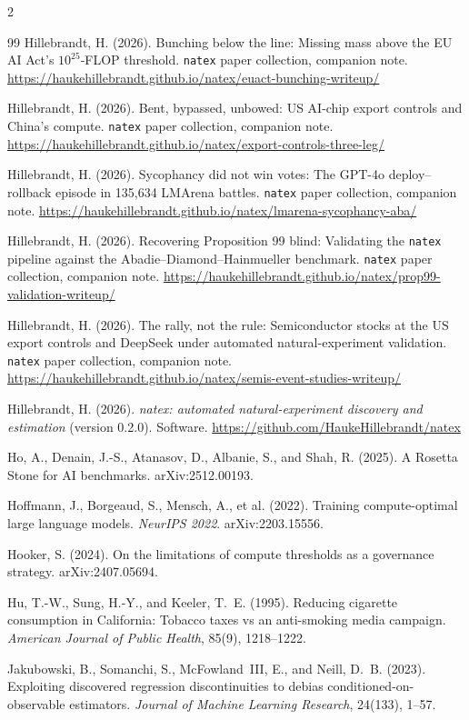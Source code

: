 \documentclass[11pt]{article}
\newcommand{\natex}{\texttt{natex}}
\begin{document}
\begin{multicols}{2}
\begin{thebibliography}{99}
Hillebrandt, H. (2026).
Bunching below the line: Missing mass above the EU AI Act's
$10^{25}$-FLOP threshold.
\natex{} paper collection, companion note.
\url{https://haukehillebrandt.github.io/natex/euact-bunching-writeup/}

Hillebrandt, H. (2026).
Bent, bypassed, unbowed: US AI-chip export controls and China's compute.
\natex{} paper collection, companion note.
\url{https://haukehillebrandt.github.io/natex/export-controls-three-leg/}

Hillebrandt, H. (2026).
Sycophancy did not win votes: The GPT-4o deploy--rollback episode in
135,634 LMArena battles.
\natex{} paper collection, companion note.
\url{https://haukehillebrandt.github.io/natex/lmarena-sycophancy-aba/}

Hillebrandt, H. (2026).
Recovering Proposition 99 blind: Validating the \natex{} pipeline against
the Abadie--Diamond--Hainmueller benchmark.
\natex{} paper collection, companion note.
\url{https://haukehillebrandt.github.io/natex/prop99-validation-writeup/}

Hillebrandt, H. (2026).
The rally, not the rule: Semiconductor stocks at the US export controls and
DeepSeek under automated natural-experiment validation.
\natex{} paper collection, companion note.
\url{https://haukehillebrandt.github.io/natex/semis-event-studies-writeup/}

Hillebrandt, H. (2026).
\emph{natex: automated natural-experiment discovery and estimation} (version
0.2.0). Software.
\url{https://github.com/HaukeHillebrandt/natex}

Ho, A., Denain, J.-S., Atanasov, D., Albanie, S., and Shah, R. (2025).
A Rosetta Stone for AI benchmarks.
arXiv:2512.00193.

Hoffmann, J., Borgeaud, S., Mensch, A., et al. (2022).
Training compute-optimal large language models.
\emph{NeurIPS 2022}. arXiv:2203.15556.

Hooker, S. (2024).
On the limitations of compute thresholds as a governance strategy.
arXiv:2407.05694.

Hu, T.-W., Sung, H.-Y., and Keeler, T.~E. (1995).
Reducing cigarette consumption in California: Tobacco taxes vs an
anti-smoking media campaign.
\emph{American Journal of Public Health}, 85(9), 1218--1222.

Jakubowski, B., Somanchi, S., McFowland~III, E., and Neill, D.~B. (2023).
Exploiting discovered regression discontinuities to debias
conditioned-on-observable estimators.
\emph{Journal of Machine Learning Research}, 24(133), 1--57.


\end{thebibliography}
\end{multicols}
\end{document}

